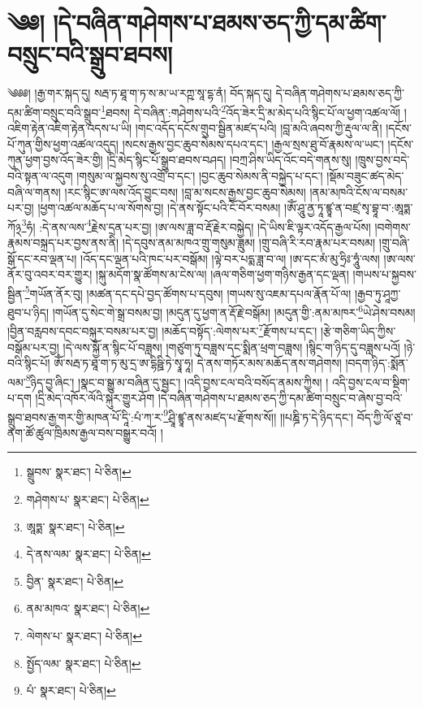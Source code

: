 \setcounter{footnote}{0} 
\chapter{༄༅། །དེ་བཞིན་གཤེགས་པ་ཐམས་ཅད་ཀྱི་དམ་ཚིག་བསྲུང་བའི་སྒྲུབ་ཐབས།}༄༅༅། །རྒྱ་གར་སྐད་དུ། སརྦ་ཏ་ཐཱ་ག་ཏ་ས་མ་ཡ་རཀྵ་སཱ་དྷ་ནཾ། བོད་སྐད་དུ། དེ་བཞིན་གཤེགས་པ་ཐམས་ཅད་ཀྱི་དམ་ཚིག་བསྲུང་བའི་སྒྲུབ་\footnote{སྒྲུབས་  སྣར་ཐང་།  པེ་ཅིན། }ཐབས། དེ་བཞིན་:གཤེགས་པའི་\footnote{གཤེགས་པ་  སྣར་ཐང་།  པེ་ཅིན། }འོད་ཟེར་དྲི་མ་མེད་པའི་སྙིང་པོ་ལ་ཕྱག་འཚལ་ལོ། །འཇིག་རྟེན་འཇིག་རྟེན་འདས་པ་ཡི། །གང་འདོད་དངོས་གྲུབ་སྦྱིན་མཛད་པའི། །བླ་མའི་ཞབས་ཀྱི་རྡུལ་ལ་ནི། །དངོས་པོ་ཀུན་གྱིས་ཕྱག་འཚལ་འདུད། །སངས་རྒྱས་བྱང་ཆུབ་སེམས་དཔའ་དང་། །རྒྱལ་སྲས་ཐུ་བོ་རྣམས་ལ་ཡང་། །དངོས་ཀུན་ཕྱག་བྱས་འོད་ཟེར་གྱི། །དྲི་མེད་སྙིང་པོ་སྒྲུབ་ཐབས་བཤད། །བཀྲ་ཤིས་ཡིད་འོང་བདེ་གནས་སུ། །ཁྲུས་བྱས་བདེ་བའི་སྟན་ལ་འདུག །གསུམ་ལ་སྐྱབས་སུ་འགྲོ་བ་དང་། །བྱང་ཆུབ་སེམས་ནི་བསྐྱེད་པ་དང་། །སྡོམ་བཟུང་ཚད་མེད་བཞི་ལ་གནས། །རང་སྙིང་ཨ་ལས་འོད་བྱུང་བས། །བླ་མ་སངས་རྒྱས་བྱང་ཆུབ་སེམས། །ནམ་མཁའི་ངོས་ལ་བསམ་པར་བྱ། །ཕྱག་འཚལ་མཆོད་པ་ལ་སོགས་བྱ། །དེ་ནས་སྟོང་པའི་ངོ་བོར་བསམ། །ཨོཾ་ཤཱུ་ནྱ་ཏཱ་ཛྙཱ་ན་བཛྲ་སྭ་བྷཱ་བ་:ཨཱཏྨ་ཀོ྅\footnote{ཨཱཏྨ་  སྣར་ཐང་།  པེ་ཅིན། }ཧཾ། :དེ་ནས་ལས་\footnote{དེ་ནས་ལམ་  སྣར་ཐང་།  པེ་ཅིན། }རྗེས་དྲན་པར་བྱ། །ཨ་ལས་ཟླ་བ་རྡོ་རྗེར་བསྐྱེད། །དེ་ཡིས་ཇི་ལྟར་འདོད་རྒྱལ་པོས། །བགེགས་རྣམས་བསྐྲད་པར་བྱས་ནས་ནི། །དེ་དབུས་ནམ་མཁའ་གྲུ་གསུམ་ཟླུམ། །གྲུ་བཞི་རི་རབ་རྣམ་པར་བསམ། །གྲུ་བཞི་སྒོ་དང་རབ་ལྡན་པ། །འོད་དང་ལྡན་པའི་ཁང་པར་བསྒོམ། །ལྟེ་བར་པདྨ་ཟླ་བ་ལ། །ཨ་དང་མཾ་མུ་ཧྲིཿ་ཧཱུཾ་ལས། །ཨ་ལས་ནོར་བུ་འབར་བར་གྱུར། །སྐུ་མདོག་སྣ་ཚོགས་མ་ངེས་ལ། །ཞལ་གཅིག་ཕྱག་གཉིས་རྒྱན་དང་ལྡན། །གཡས་པ་སྐྱབས་སྦྱིན་\footnote{བྱིན་  སྣར་ཐང་།  པེ་ཅིན། }གཡོན་ནོར་བུ། །མཚན་དང་དཔེ་བྱད་ཚོགས་པ་དབུས། །གཡས་སུ་འཇམ་དཔལ་རྣོན་པོ་ལ། །རྒྱབ་ཏུ་ཤཱཀྱ་ཐུབ་པ་ཉིད། །གཡོན་དུ་སེང་གེ་སྒྲ་བསམ་བྱ། །མདུན་དུ་ཕྱག་ན་རྡོ་རྗེ་བསྒོམ། །མདུན་གྱི་:ནམ་མཁར་\footnote{ནམ་མཁའ་  སྣར་ཐང་།  པེ་ཅིན། }ཡེ་ཤེས་བསམ། །བྱིན་བརླབས་དབང་བསྐུར་བསམ་པར་བྱ། །མཆོད་བསྟོད་:ལེགས་པར་\footnote{ལེགས་པ་  སྣར་ཐང་།  པེ་ཅིན། }རྫོགས་པ་དང་། །རྩེ་གཅིག་ཡིད་ཀྱིས་བསྒོམ་པར་བྱ། །དེ་ལས་སྐྱོ་ན་སྙིང་པོ་བཟླས། །གཙུག་ཏུ་བཟླས་དང་སྨིན་ཕྲག་བཟླས། །སྙིང་ག་ཉིད་དུ་བཟླས་པའོ། །ཉེ་བའི་སྙིང་པོ། ཨོཾ་སརྦ་ཏ་ཐཱ་ག་ཏ་མུ་དྲ་ཨ་དྷིཥྛི་ཏེ་སྭཱ་ཧཱ། དེ་ནས་གཏོར་མས་མཆོད་ནས་གཤེགས། །བདག་ཉིད་:སྨོན་ལམ་\footnote{སྤྱོད་ལམ་  སྣར་ཐང་།  པེ་ཅིན། }ཉིད་བྱ་ཞིང་། །སྣང་བ་སྒྱུ་མ་བཞིན་དུ་སྦྱང་། །འདི་བྱས་ངལ་བའི་བསོད་ནམས་ཀྱིས། །
འདི་བྱས་ངལ་བ་སྡིག་པ་དག །དྲི་མེད་འཁོར་ལོའི་སྐུར་གྱུར་ཤོག །དེ་བཞིན་གཤེགས་པ་ཐམས་ཅད་ཀྱི་དམ་ཚིག་བསྲུང་བ་ཞེས་བྱ་བའི་སྒྲུབ་ཐབས་རྒྱ་གར་གྱི་མཁན་པོ་དཱི་:པཾ་ཀ་ར་\footnote{པཾ་  སྣར་ཐང་།  པེ་ཅིན། }ཤྲཱི་ཛྙཱ་ནས་མཛད་པ་རྫོགས་སོ།། །།པཎྜི་ཏ་དེ་ཉིད་དང་། བོད་ཀྱི་ལོ་ཙཱ་བ་ནག་ཚོ་ཚུལ་ཁྲིམས་རྒྱལ་བས་བསྒྱུར་བའོ། ། 
